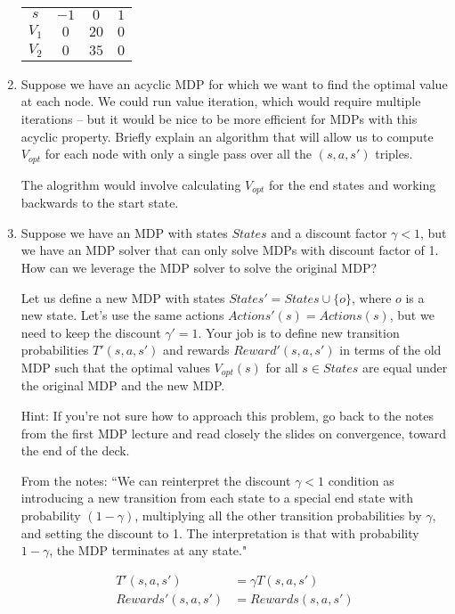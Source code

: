 \documentclass[10pt]{article}
\begin{document}
\begin{enumerate}[label=(\alph*)]
	\begin{tabular}{c | c c c}
		$s$ & $-1$ & $0$ & $1$\\
  		$V_1$ & $0$ & $20$ & $0$\\
  		$V_2$ & $0$ & $35$ & $0$\\
  	\end{tabular}
  
  \item Suppose we have an acyclic MDP for which we want to find the optimal value at each node. We could run value iteration, which would require multiple iterations -- but it would be nice to be more efficient for MDPs with this acyclic property. Briefly explain an algorithm that will allow us to compute $V_{opt}$ for each node with only a single pass over all the $(s,a,s')$ triples.
  
  The alogrithm would involve calculating $V_{opt}$ for the end states and working backwards to the start state.
  
  \item Suppose we have an MDP with states $States$ and a discount factor $\gamma < 1$, but we have an MDP solver that can only solve MDPs with discount factor of 1. How can we leverage the MDP solver to solve the original MDP?
  
  Let us define a new MDP with states $States'= States \cup \{o\}$, where $o$ is a new state. Let's use the same actions $Actions'(s) = Actions(s)$, but we need to keep the discount $\gamma' = 1$. Your job is to define new transition probabilities $T'(s,a,s')$ and rewards $Reward'(s,a,s')$ in terms of the old MDP such that the optimal values $V_{opt}(s)$ for all $s \in States$ are equal under the original MDP and the new MDP.
  
  Hint: If you're not sure how to approach this problem, go back to the notes from the first MDP lecture and read closely the slides on convergence, toward the end of the deck.
  
  From the notes: ``We can reinterpret the discount $\gamma < 1$ condition as introducing a new transition from each state to a special end state with probability $(1 - \gamma)$, multiplying all the other transition probabilities by $\gamma$, and setting the discount to 1. The interpretation is that with probability $1 - \gamma$, the MDP terminates at any state."
  
  \begin{align*}
  		T'(s,a,s') &= \gamma T(s,a,s')\\
  		Rewards'(s,a,s') &= Rewards(s,a,s')
  \end{align*}

\end{enumerate}
\iffalse
\end{document}
